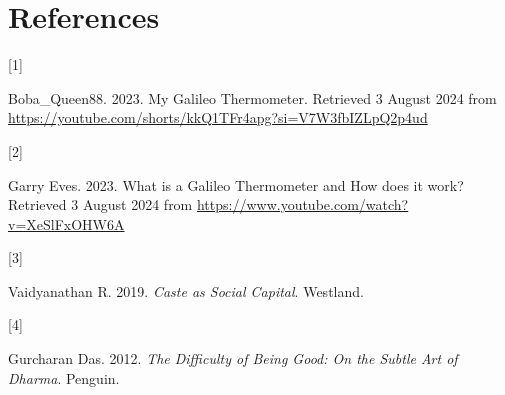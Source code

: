 \documentclass[
  a4paper,
]{article}
\newlength{\cslhangindent}
\newlength{\csllabelwidth}
\newenvironment{CSLReferences}[2] %
 {\begin{list}{}{%
  \setlength{\itemindent}{0pt}
  \setlength{\leftmargin}{0pt}
  \setlength{\parsep}{0pt}
  \ifodd #1
   \setlength{\leftmargin}{\cslhangindent}
   \setlength{\itemindent}{-1\cslhangindent}
  \fi
  \setlength{\itemsep}{#2\baselineskip}}}
 {\end{list}}
\newcommand{\CSLLeftMargin}[1]{\parbox[t]{\csllabelwidth}{\strut#1\strut}}
\newcommand{\CSLRightInline}[1]{\parbox[t]{\linewidth - \csllabelwidth}{\strut#1\strut}}
\begin{document}
\section*{References}\label{bibliography}

\label{refs}
\begin{CSLReferences}{0}{0}
\CSLLeftMargin{{[}1{]} }%
\CSLRightInline{Boba\_Queen88. 2023. {My Galileo Thermometer}. Retrieved
3 August 2024 from
\url{https://youtube.com/shorts/kkQ1TFr4apg?si=V7W3fbIZLpQ2p4ud}}

\CSLLeftMargin{{[}2{]} }%
\CSLRightInline{Garry Eves. 2023. {What is a Galileo Thermometer and How
does it work?} Retrieved 3 August 2024 from
\url{https://www.youtube.com/watch?v=XeSlFxOHW6A}}

\CSLLeftMargin{{[}3{]} }%
\CSLRightInline{Vaidyanathan R. 2019. \emph{{Caste as Social Capital}}.
Westland.}

\CSLLeftMargin{{[}4{]} }%
\CSLRightInline{Gurcharan Das. 2012. \emph{{The Difficulty of Being
Good}: {On the Subtle Art of Dharma}}. Penguin.}

\end{CSLReferences}
\end{document}
